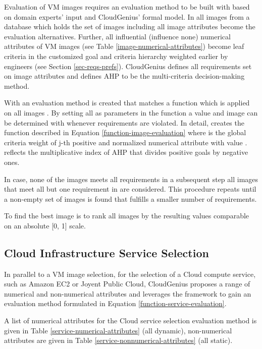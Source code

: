 \documentclass[10pt]{article}
\begin{document}
Evaluation of VM images requires an evaluation method to be built with  based on domain experts' input and CloudGenius' formal model. 
In  all images from a database which holds the set of images including all image attributes become the evaluation alternatives.
Further, all influential (influence  none) numerical attributes of VM images (see Table \ref{image-numerical-attributes}) become leaf criteria in the customized goal and criteria hierarchy weighted earlier by engineers (see Section \ref{sec-reqs-prefs}).
CloudGenius defines all requirements set on image attributes and defines AHP to be the multi-criteria decision-making method.

With  an evaluation method is created that matches a function  which is applied on all images . By setting all  as parameters in the function a value  and image  can be determined with  whenever requirements are violated. In detail,  creates the function described in Equation \ref{function-image-evaluation} where  is the global criteria weight of j-th positive and normalized numerical attribute with value .  reflects the multiplicative index of AHP that divides positive goals by negative ones.


In case, none of the images meets all requirements in a subsequent step all images that meet all but one requirement in  are considered. This procedure repeats until a non-empty set of images is found that fulfills a smaller number of requirements.

To find the best image  is to rank all images by the resulting values comparable on an absolute [0, 1] scale.


\subsection{Cloud Infrastructure Service Selection}

In parallel to a VM image selection, for the selection of a Cloud compute service, such as Amazon EC2 or Joyent Public Cloud, CloudGenius proposes a range of numerical and non-numerical attributes and leverages the  framework to gain an evaluation method  formulated in Equation \ref{function-service-evaluation}.



A list of numerical attributes for the Cloud service selection evaluation method is given in Table \ref{service-numerical-attributes} (all dynamic), non-numerical attributes are given in Table \ref{service-nonnumerical-attributes} (all static).
\end{document}
